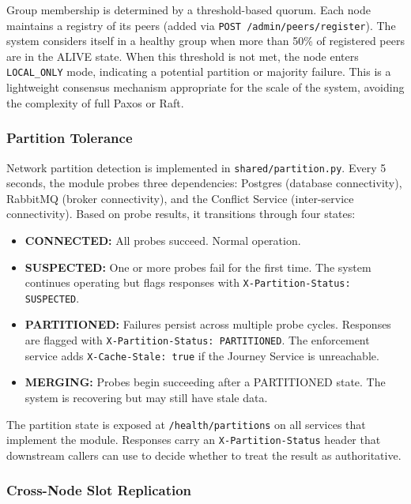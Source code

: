 \documentclass[12pt,a4paper]{article}
\begin{document}
Group membership is determined by a threshold-based quorum. Each node maintains a registry of its peers (added via \texttt{POST /admin/peers/register}). The system considers itself in a healthy group when more than 50\% of registered peers are in the ALIVE state. When this threshold is not met, the node enters \texttt{LOCAL\_ONLY} mode, indicating a potential partition or majority failure. This is a lightweight consensus mechanism appropriate for the scale of the system, avoiding the complexity of full Paxos or Raft.
 
\subsubsection{Partition Tolerance}
 
Network partition detection is implemented in \texttt{shared/partition.py}. Every 5 seconds, the module probes three dependencies: Postgres (database connectivity), RabbitMQ (broker connectivity), and the Conflict Service (inter-service connectivity). Based on probe results, it transitions through four states:
 
\begin{itemize}
    \item \textbf{CONNECTED:} All probes succeed. Normal operation.
    \item \textbf{SUSPECTED:} One or more probes fail for the first time. The system continues operating but flags responses with \texttt{X-Partition-Status: SUSPECTED}.
    \item \textbf{PARTITIONED:} Failures persist across multiple probe cycles. Responses are flagged with \texttt{X-Partition-Status: PARTITIONED}. The enforcement service adds \texttt{X-Cache-Stale: true} if the Journey Service is unreachable.
    \item \textbf{MERGING:} Probes begin succeeding after a PARTITIONED state. The system is recovering but may still have stale data.
\end{itemize}
 
The partition state is exposed at \texttt{/health/partitions} on all services that implement the module. Responses carry an \texttt{X-Partition-Status} header that downstream callers can use to decide whether to treat the result as authoritative.

\subsubsection{Cross-Node Slot Replication}
\label{sec:replication}
\end{document}
